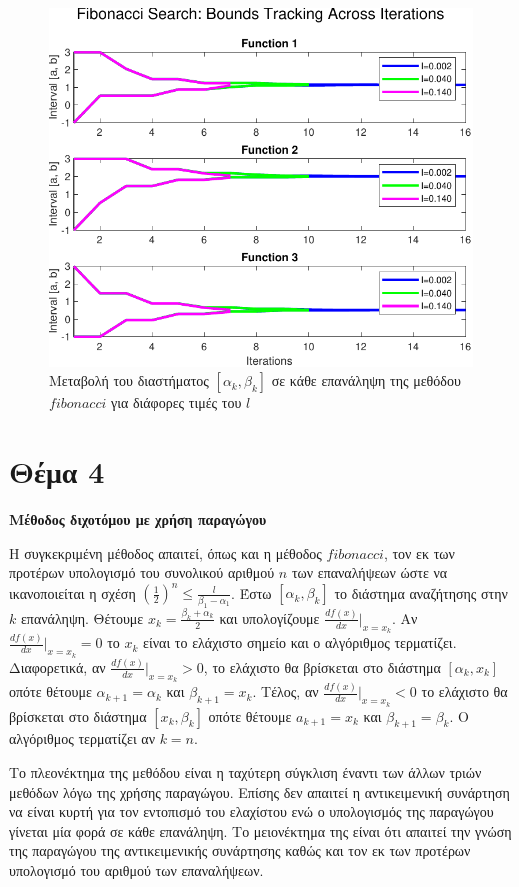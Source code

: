 \documentclass{article}
\begin{document}
\begin{figure}
    \centering
    \includegraphics[width=0.75\linewidth]{plots/task3_plot2.pdf}
    \caption{Μεταβολή του διαστήματος $[\alpha_k, \beta_k]$ σε κάθε επανάληψη της μεθόδου $fibonacci$ για διάφορες τιμές του $l$}
    \label{fig:task3_plot2}
\end{figure}

\section*{Θέμα 4}
\textbf{Μέθοδος διχοτόμου με χρήση παραγώγου}

Η συγκεκριμένη μέθοδος απαιτεί, όπως και η μέθοδος $fibonacci$, τον εκ των προτέρων υπολογισμό του συνολικού αριθμού
$n$ των επαναλήψεων ώστε να ικανοποιείται η σχέση $\left(\frac{1}{2}\right)^{n} \leq \frac{l}{\beta_1 - \alpha_1}$.
Έστω $[\alpha_k, \beta_k]$ το διάστημα αναζήτησης στην $k$ επανάληψη. Θέτουμε $x_k = \frac{\beta_k + \alpha_k}{2}$
και υπολογίζουμε $\frac{df(x)}{dx}\Big|_{x = x_k}$. Αν $\frac{df(x)}{dx}\Big|_{x = x_k} = 0$ το $x_k$ είναι το
ελάχιστο σημείο και ο αλγόριθμος τερματίζει. Διαφορετικά, αν $\frac{df(x)}{dx}\Big|_{x = x_k} > 0$, το ελάχιστο
θα βρίσκεται στο διάστημα $[\alpha_{k}, x_k]$ οπότε θέτουμε $\alpha_{k+1} = \alpha_k$ και $\beta_{k+1} = x_k$. 
Τέλος, αν $\frac{df(x)}{dx}\Big|_{x = x_k} < 0$ το ελάχιστο θα βρίσκεται στο διάστημα $[x_k, \beta_k]$ οπότε 
θέτουμε $a_{k+1} = x_k$ και $\beta_{k+1} = \beta_k$. Ο αλγόριθμος τερματίζει αν $k = n$.

Το πλεονέκτημα της μεθόδου είναι η ταχύτερη σύγκλιση έναντι των άλλων τριών μεθόδων λόγω της χρήσης παραγώγου.
Επίσης δεν απαιτεί η αντικειμενική συνάρτηση να είναι κυρτή για τον εντοπισμό του ελαχίστου ενώ ο υπολογισμός
της παραγώγου γίνεται μία φορά σε κάθε επανάληψη. Το μειονέκτημα της είναι ότι απαιτεί την γνώση της παραγώγου 
της αντικειμενικής συνάρτησης καθώς και τον εκ των προτέρων υπολογισμό του αριθμού των επαναλήψεων.
\end{document}
